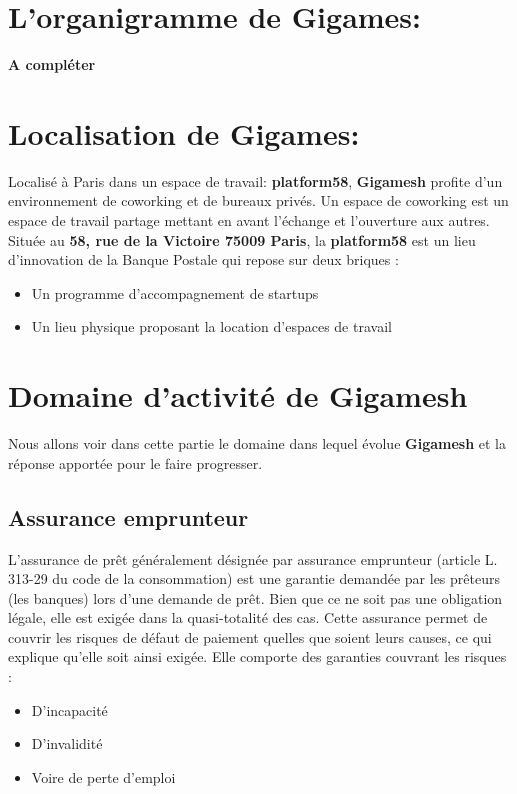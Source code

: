 
\section{L’organigramme de Gigames:}

 \textbf{A compléter}

\section{Localisation de Gigames:}

Localisé à Paris dans un espace de travail: \textbf{platform58}, \textbf{Gigamesh} profite d’un environnement de coworking et de bureaux privés. Un espace de coworking est un espace de travail partage mettant en avant l’échange et l’ouverture aux autres. Située au \textbf{58, rue de la Victoire 75009 Paris}, la \textbf{platform58} est un lieu d’innovation de la Banque Postale qui
repose sur deux briques :
\begin{itemize}
	\item Un programme d’accompagnement de startups
	\item Un lieu physique proposant la location d’espaces de travail
\end{itemize}

\section{Domaine d’activité de Gigamesh}
Nous allons voir dans cette partie le domaine dans lequel évolue \textbf{Gigamesh} et la réponse apportée pour le faire progresser.
\subsection{Assurance emprunteur}


L’assurance de prêt généralement désignée par assurance emprunteur (article L. 313-29 du code de la
consommation) est une garantie demandée par les prêteurs (les banques) lors d’une demande de prêt.
Bien que ce ne soit pas une obligation légale, elle est exigée dans la quasi-totalité des cas. Cette assurance permet de couvrir les risques de défaut de paiement quelles que soient leurs causes, ce qui explique qu’elle soit ainsi exigée. Elle comporte des garanties couvrant les risques :
\begin{itemize}
	\item D’incapacité
	\item D’invalidité
	\item Voire de perte d’emploi
\end{itemize}

